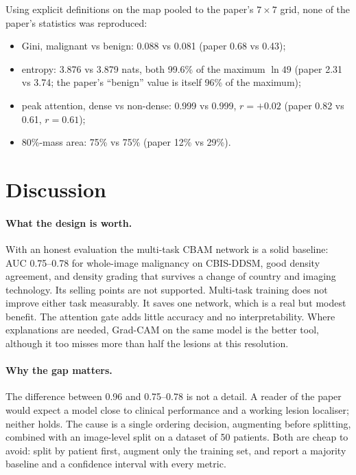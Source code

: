 \documentclass[10pt,a4paper]{article}
\begin{document}
Using explicit definitions on the map pooled to the paper's $7\times7$ grid, none of the paper's statistics
was reproduced:
\begin{itemize}
\item Gini, malignant vs benign: 0.088 vs 0.081 (paper 0.68 vs 0.43);
\item entropy: 3.876 vs 3.879 nats, both 99.6\% of the maximum $\ln 49$ (paper 2.31 vs 3.74; the paper's ``benign''
value is itself 96\% of the maximum);
\item peak attention, dense vs non-dense: 0.999 vs 0.999, $r=+0.02$ (paper 0.82 vs 0.61, $r=0.61$);
\item 80\%-mass area: 75\% vs 75\% (paper 12\% vs 29\%).
\end{itemize}

\section{Discussion}
\paragraph{What the design is worth.} With an honest evaluation the multi-task CBAM network is a solid baseline: AUC
0.75--0.78 for whole-image malignancy on CBIS-DDSM, good density agreement, and density grading that survives a change
of country and imaging technology. Its selling points are not supported. Multi-task training does not improve either
task measurably. It saves one network, which is a real but modest benefit. The attention gate adds little accuracy and
no interpretability. Where explanations are needed, Grad-CAM on the same model is the better tool, although it too
misses more than half the lesions at this resolution.

\paragraph{Why the gap matters.} The difference between 0.96 and 0.75--0.78 is not a detail. A reader of the paper
would expect a model close to clinical performance and a working lesion localiser; neither holds. The cause is a
single ordering decision, augmenting before splitting, combined with an image-level split on a dataset of 50 patients.
Both are cheap to avoid: split by patient first, augment only the training set, and report a majority baseline and a
confidence interval with every metric.
\end{document}
